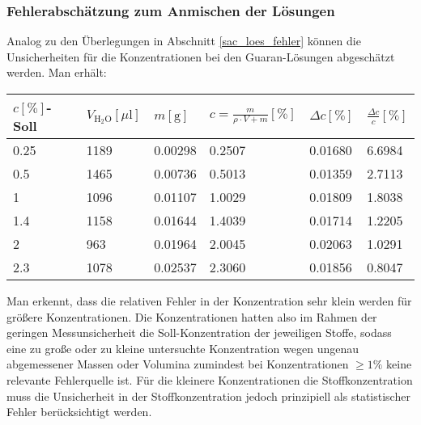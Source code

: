 \documentclass[11pt,a4paper,oneside]{scrartcl}
\begin{document}
\subsubsection{Fehlerabschätzung zum Anmischen der Lösungen}
Analog zu den Überlegungen in Abschnitt \ref{sac_loes_fehler} können die Unsicherheiten für die Konzentrationen bei den Guaran-Lösungen abgeschätzt werden. Man erhält:\\
\begin{table}[H]
    \centering
    \begin{tabular}{llllll}
    \hline
        $c [\%]$-Soll & $V_{\mathrm{H_2O}} [\mu \mathrm l]$ & $m [\mathrm g]$ & $c=\frac{m}{\rho\cdot V+m}[\%]$ & $\Delta c[\%]$ & $\frac{\Delta c}{c}[\%]$ \\ \hline
             0.25 & 1189 & 0.00298 & 0.2507 & 0.01680 & 6.6984 \\ 
        0.5 & 1465 & 0.00736 & 0.5013 & 0.01359 & 2.7113 \\ 
        1 & 1096 & 0.01107 & 1.0029 & 0.01809 & 1.8038 \\ 
        1.4 & 1158 & 0.01644 & 1.4039 & 0.01714 & 1.2205 \\ 
        2 & 963 & 0.01964 & 2.0045 & 0.02063 & 1.0291 \\ 
        2.3 & 1078 & 0.02537 & 2.3060 & 0.01856 & 0.8047 \\  \hline
    \end{tabular}
\end{table}
Man erkennt, dass die relativen Fehler in der Konzentration sehr klein werden für größere Konzentrationen. Die Konzentrationen hatten also im Rahmen der geringen Messunsicherheit die Soll-Konzentration der jeweiligen Stoffe, sodass eine zu große oder zu kleine untersuchte Konzentration wegen ungenau abgemessener Massen oder Volumina zumindest bei Konzentrationen $\geq 1\%$ keine relevante Fehlerquelle ist. Für die kleinere Konzentrationen die Stoffkonzentration muss die Unsicherheit in der Stoffkonzentration jedoch prinzipiell als statistischer Fehler berücksichtigt werden.
\end{document}
